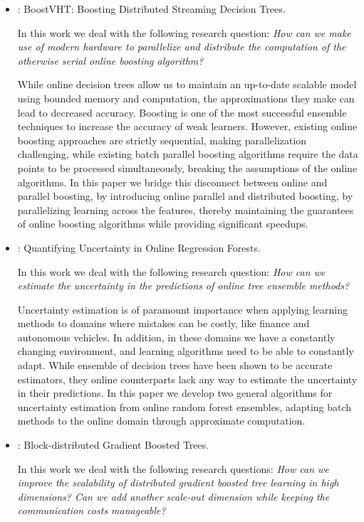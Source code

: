 \begin{itemize}
	\item \textbf{\boostvht}: BoostVHT: Boosting Distributed Streaming Decision Trees.

	In this work we deal with the following research question:
	\emph{How can we make use of modern hardware to parallelize and distribute
	the computation of the otherwise serial online boosting algorithm?}

	While online decision trees allow us to maintain an up-to-date scalable
	model using bounded memory and computation, the approximations they make
	can lead to decreased accuracy.
	Boosting is one of the most successful ensemble techniques to increase the
	accuracy of weak learners. However, existing online boosting approaches
	are strictly sequential, making parallelization challenging, while existing batch parallel boosting algorithms
	require the data points to be processed simultaneously, breaking the assumptions
	of the online algorithms. In this paper we bridge
	this disconnect between online and parallel boosting, by introducing
	online parallel and distributed boosting, by parallelizing learning
	across the features, thereby maintaining the guarantees of online boosting
	algorithms while providing significant speedups.

	\item \textbf{\uncertaintrees}: Quantifying Uncertainty in Online Regression Forests.

	In this work we deal with the following research question:
	\emph{How can we estimate the uncertainty in the predictions of online tree
	ensemble methods?}

	Uncertainty estimation is of paramount importance when applying learning methods
	to domains where mistakes can be costly, like finance and autonomous vehicles.
	In addition, in these domains we have a constantly changing environment,
	and learning algorithms need to be able to constantly adapt. While ensemble
	of decision trees have been shown to be accurate estimators, they online
	counterparts lack any way to estimate the uncertainty in their predictions.
	In this paper we develop two general algorithms for uncertainty estimation
	from online random forest ensembles, adapting batch methods to the online
	domain through approximate computation.


	\item \textbf{\blockgbt}: Block-distributed Gradient Boosted Trees.


	In this work we deal with the following research questions:
	\emph{How can we improve the scalability of distributed gradient boosted tree learning
	in high dimensions? Can we add another scale-out dimension while keeping the
	communication costs manageable?}


\end{itemize}
